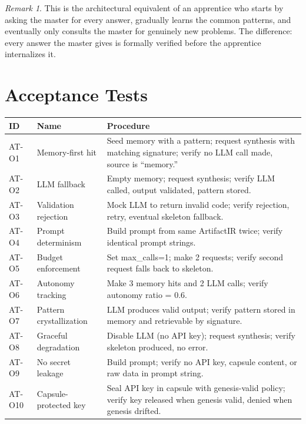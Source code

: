 \documentclass[11pt,a4paper,twoside]{article}
\theoremstyle{definition}
\theoremstyle{plain}
\theoremstyle{remark}
\newtheorem{remark}{Remark}[section]
\begin{document}
\begin{remark}
This is the architectural equivalent of an apprentice who starts by
asking the master for every answer, gradually learns the common
patterns, and eventually only consults the master for genuinely
new problems. The difference: every answer the master gives is
formally verified before the apprentice internalizes it.
\end{remark}


\part{Acceptance Tests}\label{part:tests}

\begin{longtable}{l l p{6.5cm}}
\toprule
\textbf{ID} & \textbf{Name} & \textbf{Procedure} \\
\midrule
\endfirsthead \midrule \endhead \bottomrule \endfoot
AT-O1 & Memory-first hit & Seed memory with a pattern; request
  synthesis with matching signature; verify no LLM call made,
  source is ``memory.'' \\
AT-O2 & LLM fallback & Empty memory; request synthesis; verify
  LLM called, output validated, pattern stored. \\
AT-O3 & Validation rejection & Mock LLM to return invalid code;
  verify rejection, retry, eventual skeleton fallback. \\
AT-O4 & Prompt determinism & Build prompt from same ArtifactIR twice;
  verify identical prompt strings. \\
AT-O5 & Budget enforcement & Set max\_calls=1; make 2 requests;
  verify second request falls back to skeleton. \\
AT-O6 & Autonomy tracking & Make 3 memory hits and 2 LLM calls;
  verify autonomy ratio = 0.6. \\
AT-O7 & Pattern crystallization & LLM produces valid output; verify
  pattern stored in memory and retrievable by signature. \\
AT-O8 & Graceful degradation & Disable LLM (no API key); request
  synthesis; verify skeleton produced, no error. \\
AT-O9 & No secret leakage & Build prompt; verify no API key,
  capsule content, or raw data in prompt string. \\
AT-O10 & Capsule-protected key & Seal API key in capsule with
  genesis-valid policy; verify key released when genesis valid,
  denied when genesis drifted. \\
\end{longtable}
\end{document}
